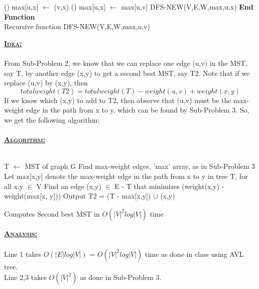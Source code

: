 \documentclass[a4 paper]{article}
\begin{document}
\vspace{4mm}
\begin{algorithm}[H]
\SetAlgoLined
{}%
\Fn(){\FRecurs}
{
{
    {   
        {
             max[u,x] $\leftarrow$ (v,x)\;
        }
        \Else(\tcc*[f]{})
        {
            max[u,x] $\leftarrow$ max[u,v]\;
        }
        DFS-NEW(V,E,W,max,u,x)\;
    }
}
}
\textbf{End Function}\\
\caption{Recursive function DFS-NEW(V,E,W,max,u,v)}
\end{algorithm}
\vspace{4mm}
\newpage
{}
\textbf{\underline{\textsc{Idea:}}}\\\\
From Sub-Problem 2, we know that we can replace one edge (u,v) in the MST, say T, by another edge (x,y) to get a second best MST, say T2. Note that if we replace (u,v) by (x,y), then $$totalweight(T2) = totalweight(T) - weight(u,v) + weight(x,y)$$
If we know which (x,y) to add to T2, then observe that (u,v) must be the max-weight edge in the path from x to y, which can be found by Sub-Problem 3. So, we get the following algorithm:\\\\
\textbf{\underline{\textsc{Algorithm:}}}\\\\
\begin{algorithm}[H]
\SetAlgoLined
{}
T $\leftarrow$ MST of graph G\;
Find max-weight edges, 'max' array, as in Sub-Problem 3\;
Let max[x,y] denote the max-weight edge in the path from x to y in tree T, for all x,y $\in$ V\;
Find an edge (x,y) $\in$ E - T that minimizes (weight(x,y) - weight(max[x, y]))\;
Output T2 = (T - max[x,y]) $\cup$ (x,y)\;
\caption{Computes Second best MST in $O(|V|^{2}log|V|)$ time}
\end{algorithm}
\vspace{4mm}
\textbf{\underline{\textsc{Analysis:}}}\\\\
Line 1 takes $O(|E|log|V|)$ = $O(|V|^{2}log|V|)$ time as done in class using AVL tree. \\
Line 2,3 takes $O(|V|^{2})$ as done in Sub-Problem 3.\\
\end{document}
